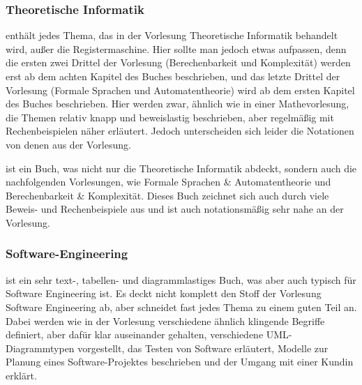 \subsubsection{Theoretische Informatik}
\begin{description}[style=unboxed]

\item[Vossen, Witt: Grundkurs Theoretische Informatik]{
	enthält jedes Thema, das in der Vorlesung Theoretische Informatik behandelt wird, außer die Registermaschine. Hier sollte man jedoch etwas aufpassen, denn die ersten zwei Drittel der Vorlesung (Berechenbarkeit und Komplexität) werden erst ab dem achten Kapitel des Buches beschrieben, und das letzte Drittel der Vorlesung (Formale Sprachen und Automatentheorie) wird ab dem ersten Kapitel des Buches beschrieben. Hier werden zwar, ähnlich wie in einer Mathevorlesung, die Themen relativ knapp und beweislastig beschrieben, aber regelmäßig mit Rechenbeispielen näher erläutert. Jedoch unterscheiden sich leider die Notationen von denen aus der Vorlesung.}

\item[Cohen: Introduction to Computer Theory]{ 
	ist ein Buch, was nicht nur die Theoretische Informatik abdeckt, sondern auch die nachfolgenden Vorlesungen, wie Formale Sprachen \& Automatentheorie und Berechenbarkeit \& Komplexität. Dieses Buch zeichnet sich auch durch viele Beweis- und Rechenbeispiele aus und ist auch nota\-tionsmäßig sehr nahe an der Vorlesung.}
\end{description}

\subsubsection{Software-Engineering}
\begin{description}[style=unboxed]

\item[Sommerville: Software Engineering]{
	ist ein sehr text-, tabellen- und diagrammlastiges Buch, was aber auch typisch für Software Engineering ist. Es deckt nicht komplett den Stoff der Vorlesung Software Engineering ab, aber schneidet fast jedes Thema zu einem guten Teil an. Dabei werden wie in der Vorlesung verschiedene ähnlich klingende Begriffe definiert, aber dafür klar auseinander gehalten, verschiedene UML-Diagrammtypen vorgestellt, das Testen von Software erläutert, Modelle zur Planung eines Software-Projektes beschrieben und der Umgang mit einer Kundin erklärt.}
\end{description}

